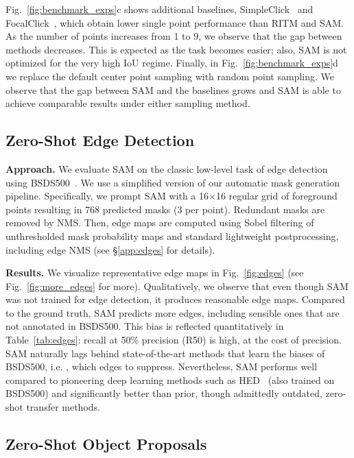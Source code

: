 Fig.~\ref{fig:benchmark_exps}{\color{linkcolor}c} shows additional baselines, SimpleClick~\cite{liu2022simpleclick} and FocalClick~\cite{chen2022focalclick}, which obtain lower single point performance than RITM and SAM. As the number of points increases from 1 to 9, we observe that the gap between methods decreases. This is expected as the task becomes easier; also, SAM is not optimized for the very high IoU regime. Finally, in Fig.~\ref{fig:benchmark_exps}{\color{linkcolor}d} we replace the default center point sampling with random point sampling. We observe that the gap between SAM and the baselines grows and SAM is able to achieve comparable results under either sampling method.

\subsection{Zero-Shot Edge Detection}\label{sec:eval:edge}

\textbf{Approach.} We evaluate SAM on the classic low-level task of edge detection using BSDS500~\cite{martin2001database,arbelaez2010contour}. We use a simplified version of our automatic mask generation pipeline. Specifically, we prompt SAM with a 16${\times}$16 regular grid of foreground points resulting in 768 predicted masks (3 per point). Redundant masks are removed by NMS. Then, edge maps are computed using Sobel filtering of unthresholded mask probability maps and standard lightweight postprocessing, including edge NMS (see \S\ref{app:edges} for details).

\textbf{Results.} We visualize representative edge maps in Fig.~\ref{fig:edges} (see Fig.~\ref{fig:more_edges} for more). Qualitatively, we observe that even though SAM was not trained for edge detection, it produces reasonable edge maps. Compared to the ground truth, SAM predicts more edges, including sensible ones that are not annotated in BSDS500. This bias is reflected quantitatively in Table~\ref{tab:edges}: recall at 50\% precision (R50) is high, at the cost of precision. SAM naturally lags behind state-of-the-art methods that learn the biases of BSDS500, i.e. , which edges to suppress. Nevertheless, SAM performs well compared to pioneering deep learning methods such as HED~\cite{xie2015holistically} (also trained on BSDS500) and significantly better than prior, though admittedly outdated, zero-shot transfer methods.

\subsection{Zero-Shot Object Proposals}\label{subsec:proposals}

